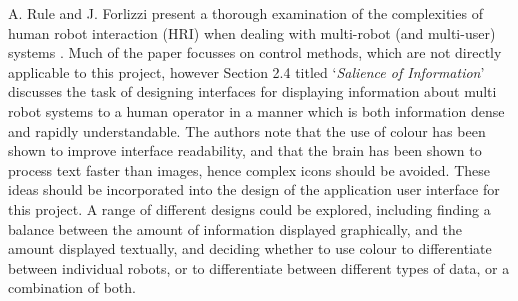 \documentclass[titlepage,hidelinks,10pt]{article}
\begin{document}
A. Rule and J. Forlizzi present a thorough examination of the complexities of human robot interaction (HRI) when dealing with multi-robot (and multi-user) systems \cite{DesginingInterfaces}. Much of the paper focusses on control methods, which are not directly applicable to this project, however Section 2.4 titled `\textit{Salience of Information}' discusses the task of designing interfaces for displaying information about multi robot systems to a human operator in a manner which is both information dense and rapidly understandable. The authors note that the use of colour has been shown to improve interface readability\cite{InterfaceColour}, and that the brain has been shown to process text faster than images\cite{InterfaceText}, hence complex icons should be avoided. These ideas should be incorporated into the design of the application user interface for this project. A range of different designs could be explored, including finding a balance between the amount of information displayed graphically, and the amount displayed textually, and deciding whether to use colour to differentiate between individual robots, or to differentiate between different types of data, or a combination of both.
\end{document}
